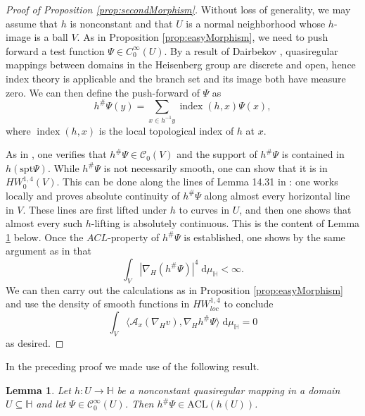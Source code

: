 \documentclass[10pt,letterpaper]{amsart}
\newtheorem{lemma}[thm]{Lemma}
\theoremstyle{definition}
\numberwithin{thm}{subsection}
\numberwithin{equation}{section}
\begin{document}
\begin{proof}[Proof of Proposition \ref{prop:secondMorphism}] Without loss of generality, we may assume that $h$ is nonconstant and that $U$ is a normal neighborhood whose $h$-image is a ball $V$.
As in Proposition \ref{prop:easyMorphism}, we need to push forward
a test function $\Psi\in C^\infty_0(U)$. By a result of Dairbekov
\cite{MR1778673}, quasiregular mappings between domains in the
Heisenberg group are discrete and open, hence index theory is
applicable and the branch set and its image both have measure
zero. We can then define the push-forward of $\Psi$ as
$$h^\# \Psi (y) = \sum_{x\in h^{-1}y} \operatorname{index}(h, x) \Psi(x),$$
where $\operatorname{index}(h,x)$ is the local topological index of $h$ at $x$.

As in \cite[Lemma 14.30]{MR1207810}, one verifies that $h^\# \Psi\in \mathcal{C}_0(V)$ and the support of $h^\# \Psi$ is contained in $h(\mathrm{spt}\Psi)$.
While $h^\#\Psi$ is not necessarily smooth, one can show that it
is in $HW^{1, 4}_{0}(V)$. This can be done along the lines of Lemma
14.31 in \cite{MR1207810}: one works locally and proves absolute
continuity of $h^\# \Psi$ along almost every horizontal line in
$V$. These lines are first lifted under $h$  to curves in $U$, and then one
shows that almost every  such $h$-lifting is absolutely continuous.
This is the content of Lemma \ref{l:ac_lift} below.
Once the $ACL$-property of $h^\# \Psi$ is established, one shows by the same argument as in \cite[Lemma 14.31]{MR1207810}
that
\begin{displaymath}
\int_V |\nabla_H (h^\# \Psi)|^4 \;\mathrm{d}\mu_{\mathbb{H}} <\infty.
\end{displaymath}
We can then carry out the calculations as in Proposition
\ref{prop:easyMorphism} and use the density of smooth functions in
$HW^{1,4}_{loc}$ to conclude
$$\int_{V}  \langle  \mathcal A_{x}(\nabla_H v), \nabla_H h^\#\Psi \rangle\;\mathrm{d}\mu_{\mathbb H} =0$$ as desired.
\end{proof}

In the preceding proof we made use of the following result.

\begin{lemma}\label{l:ac_lift}
Let $h:U\to\mathbb{H}$ be a nonconstant quasiregular mapping in a domain $U\subseteq\mathbb{H}$ and let $\Psi\in\mathcal{C}^{\infty}_0(U)$. Then $h^\#\Psi\in \mathrm{ACL}(h(U))$.
\end{lemma}
\end{document}
